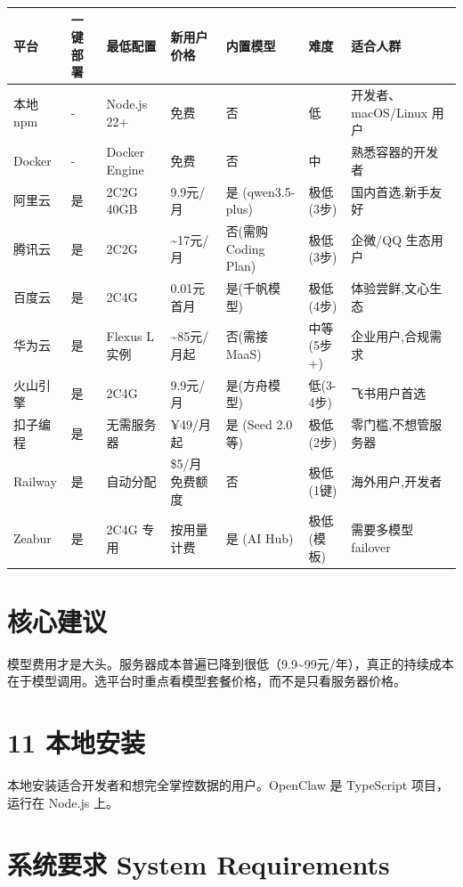 \documentclass[
  10
]{article}
\newcounter{none} %
\begin{document}
{\def\LTcaptype{none} %
\begin{longtable}[]{@{}|l|l|l|l|l|l|l|@{}}
\toprule\noalign{}
\endhead
\bottomrule\noalign{}
\endlastfoot
\hline
平台 & 一键部署 & 最低配置 & 新用户价格 & 内置模型 & 难度 & 适合人群 \\
\hline
本地npm & - & Node.js 22+ & 免费 & 否 & 低 & 开发者、macOS/Linux 用户 \\
\hline
Docker & - & Docker Engine & 免费 & 否 & 中 & 熟悉容器的开发者 \\
\hline
阿里云 & 是 & 2C2G 40GB & 9.9元/月 & 是 (qwen3.5-plus) & 极低(3步) &
国内首选,新手友好 \\
\hline
腾讯云 & 是 & 2C2G & \textasciitilde17元/月 & 否(需购Coding Plan) &
极低(3步) & 企微/QQ 生态用户 \\
\hline
百度云 & 是 & 2C4G & 0.01元首月 & 是(千帆模型) & 极低(4步) &
体验尝鲜,文心生态 \\
\hline
华为云 & 是 & Flexus L 实例 & \textasciitilde85元/月起 & 否(需接MaaS) &
中等(5步+) & 企业用户,合规需求 \\
\hline
火山引擎 & 是 & 2C4G & 9.9元/月 & 是(方舟模型) & 低(3-4步) &
飞书用户首选 \\
\hline
扣子编程 & 是 & 无需服务器 & ¥49/月起 & 是 (Seed 2.0等) & 极低(2步) &
零门槛,不想管服务器 \\
\hline
Railway & 是 & 自动分配 & \$5/月免费额度 & 否 & 极低(1键) &
海外用户,开发者 \\
\hline
Zeabur & 是 & 2C4G 专用 & 按用量计费 & 是 (AI Hub) & 极低(模板) &
需要多模型 failover \\
\hline
\end{longtable}
}

\section{核心建议}\label{ux6838ux5fc3ux5efaux8bae-4}

模型费用才是大头。服务器成本普遍已降到很低（9.9\textasciitilde99元/年），真正的持续成本在于模型调用。选平台时重点看模型套餐价格，而不是只看服务器价格。

\section{11 本地安装}\label{ux672cux5730ux5b89ux88c5}

本地安装适合开发者和想完全掌控数据的用户。OpenClaw 是 TypeScript
项目，运行在 Node.js 上。

\section{系统要求 System
Requirements}\label{ux7cfbux7edfux8981ux6c42-system-requirements}
\end{document}
